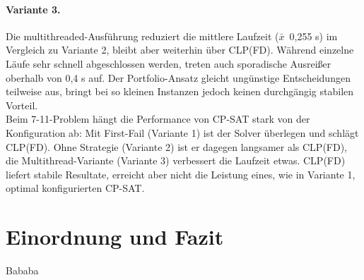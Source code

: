 \documentclass[12pt,a4paper]{article}
\begin{document}
\paragraph{Variante 3.}
Die multithreaded-Ausführung reduziert die mittlere Laufzeit ($\bar{x}$~0,255 s) im Vergleich zu Variante 2, bleibt aber weiterhin über CLP(FD).
Während einzelne Läufe sehr schnell abgeschlossen werden, treten auch sporadische Ausreißer oberhalb von 0,4 s auf.
Der Portfolio-Ansatz gleicht ungünstige Entscheidungen teilweise aus, bringt bei so kleinen Instanzen jedoch keinen durchgängig stabilen Vorteil.
\\

\noindent
Beim 7-11-Problem hängt die Performance von CP-SAT stark von der Konfiguration ab: Mit First-Fail (Variante 1) ist der Solver überlegen und schlägt CLP(FD).
Ohne Strategie (Variante 2) ist er dagegen langsamer als CLP(FD), die Multithread-Variante (Variante 3) verbessert die Laufzeit etwas.
CLP(FD) liefert stabile Resultate, erreicht aber nicht die Leistung eines, wie in Variante 1, optimal konfigurierten CP-SAT.
\section{Einordnung und Fazit}
Bababa
\end{document}
